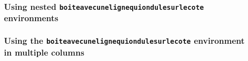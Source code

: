 \documentclass[a4paper,10pt]{article}
\begin{document}
\subsubsection*{Using nested \texttt{boiteavecunelignequiondulesurlecote} environments}

\begin{Example}
  \bkcountfalse
  \begin{boiteavecunelignequiondulesurlecote}
    \lipsum[1]\bigskip
    \begin{boiteavecunelignequiondulesurlecote}
      \lipsum[2]\bigskip
      \begin{boiteavecunelignequiondulesurlecote}
        \lipsum[3]\bigskip
      \end{boiteavecunelignequiondulesurlecote}
      \lipsum[4]
    \end{boiteavecunelignequiondulesurlecote}
    \lipsum[5]
  \end{boiteavecunelignequiondulesurlecote}
\end{Example}

\subsubsection*{Using the \texttt{boiteavecunelignequiondulesurlecote} environment in multiple columns}

\begin{Example}
  \bkcountfalse
  \begin{multicols}{2}
    \lipsum[1]
    \begin{boiteavecunelignequiondulesurlecote}
      \lipsum[2-4]
    \end{boiteavecunelignequiondulesurlecote}
    \lipsum[5]
    \begin{boiteavecunelignequiondulesurlecote}
      \lipsum[6-8]
    \end{boiteavecunelignequiondulesurlecote}
    \lipsum[9-14]
  \end{multicols}
\end{Example}
\end{document}

